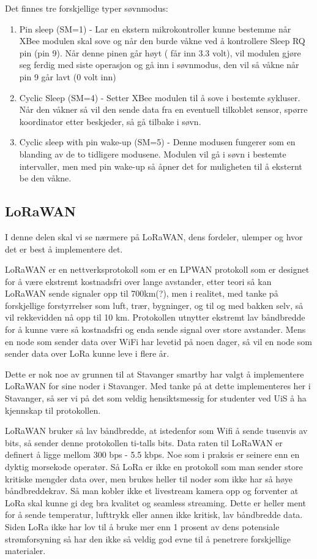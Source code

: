 \documentclass{article}
\begin{document}
Det finnes tre forskjellige typer søvnmodus:
\begin{enumerate}
	\item Pin sleep (SM=1) - Lar en ekstern mikrokontroller kunne bestemme når XBee modulen skal sove og når den burde våkne ved å kontrollere Sleep RQ pin (pin 9). Når denne pinen går høyt ( får inn 3.3 volt), vil modulen gjøre seg ferdig med siste operasjon og gå inn i søvnmodus, den vil så våkne når pin 9 går lavt (0 volt inn)
	\item Cyclic Sleep (SM=4) - Setter XBee modulen til å sove i bestemte sykluser. Når den våkner så vil den sende data fra en eventuell tilkoblet sensor, spørre koordinator etter beskjeder, så gå tilbake i søvn.
	\item Cyclic sleep with pin wake-up (SM=5) - Denne modusen fungerer som en blanding av de to tidligere modusene. Modulen vil gå i søvn i bestemte intervaller, men med pin wake-up så åpner det for muligheten til å eksternt be den våkne.
\end{enumerate}



\subsection{LoRaWAN}
I denne delen skal vi se nærmere på LoRaWAN, dens fordeler, ulemper og hvor det er best å implementere det.

LoRaWAN er en nettverksprotokoll som er en LPWAN protokoll som er designet for å være ekstremt kostnadsfri over lange avstander, etter teori så kan LoRaWAN sende signaler opp til 700km(?), men i realitet, med tanke på forskjellige forstyrrelser som luft, trær, bygninger, og til og med bakken selv, så vil rekkevidden nå opp til 10 km. Protokollen utnytter ekstremt lav båndbredde for å kunne være så kostnadsfri og enda sende signal over store avstander. Mens en node som sender data over WiFi har levetid på noen dager, så vil en node som sender data over LoRa kunne leve i flere år.

Dette er nok noe av grunnen til at Stavanger smartby har valgt å implementere LoRaWAN for sine noder i Stavanger. Med tanke på at dette implementeres her i Stavanger, så ser vi på det som veldig hensiktsmessig for studenter ved UiS å ha kjennskap til protokollen.

LoRaWAN bruker så lav båndbredde, at istedenfor som Wifi å sende tusenvis av bits, så sender denne protokollen ti-talls bits. Data raten til LoRaWAN er definert å ligge mellom 300 bps - 5.5 kbps. Noe som i praksis er seinere enn en dyktig morsekode operatør. Så LoRa er ikke en protokoll som man sender store kritiske mengder data over, men brukes heller til noder som ikke har så høye båndbreddekrav. Så man kobler ikke et livestream kamera opp og forventer at LoRa skal kunne gi deg bra kvalitet og seamless streaming. Dette er heller ment for å sende temperatur, lufttrykk eller annen ikke kritisk, lav båndbredde data.
Siden LoRa ikke har lov til å bruke mer enn 1 prosent av dens potensiale strømforsyning så har den ikke så veldig god evne til å penetrere forskjellige materialer.
\end{document}
